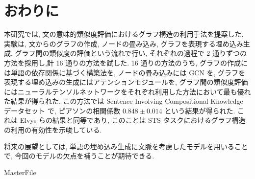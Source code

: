 \documentclass[a4j,twoside,12pt]{thesis} %
\begin{document}
\addtocounter{chapter}{+5}

\setlength{\baselineskip}{1.95zw}
\setlength{\textheight}{30\baselineskip}

\fi


\chapter{おわりに}\label{conc}
本研究では, 文の意味的類似度評価におけるグラフ構造の利用手法を提案した.
実験は, 文からのグラフの作成, ノードの畳み込み, グラフを表現する埋め込み生成, グラフ間の類似度の評価という流れで行い, それぞれの過程で 2 通りずつの方法を採用し,計 16 通りの方法を試した.
16 通りの方法のうち, グラフの作成には単語の依存関係に基づく構築法を, ノードの畳み込みには GCN を, グラフを表現する埋め込みの生成にはアテンションモジュールを, グラフ間の類似度評価にはニューラルテンソルネットワークをそれぞれ利用した方法において最も優れた結果が得られた. この方法では Sentence Involving Compositional Knowledge データセット で, ピアソンの相関係数 $0.848 \pm 0.014$ という結果が得られた.
これは Elvys らの結果と同等であり, このことは STS タスクにおけるグラフ構造の利用の有効性を示唆している.
\par 将来の展望としては, 単語の埋め込み生成に文脈を考慮したモデルを用いることで, 今回のモデルの欠点を補うことが期待できる.

\expandafter\ifx\csname MasterFile\endcsname\relax
\def\MasterFile{本原稿です}

% 



\end{document}
